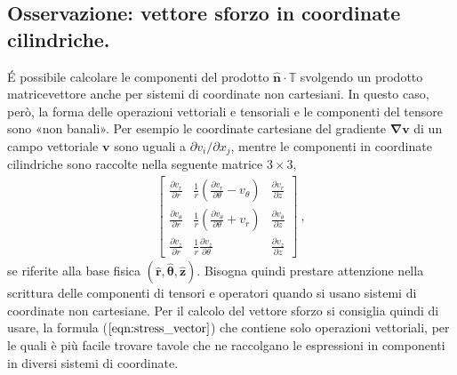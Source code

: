 \documentclass[letterpaper,10pt,italian]{jupyterBook}
\begin{document}
\subsection{Osservazione: vettore sforzo in coordinate cilindriche.}
\label{\detokenize{polimi/fluidmechanics-ita/template/capitoli/06_slnEsatte/0600in:osservazione-vettore-sforzo-in-coordinate-cilindriche}}
\sphinxAtStartPar
É possibile calcolare le componenti del prodotto
\(\mathbf{\hat{n}} \cdot \mathbb{T}\) svolgendo un prodotto matrice\sphinxhyphen{}vettore
anche per sistemi di coordinate non cartesiani. In questo caso, però, la
forma delle operazioni vettoriali e tensoriali e le componenti del
tensore sono «non banali». Per esempio le coordinate cartesiane del
gradiente \(\mathbf{\nabla} \mathbf{v}\) di un campo vettoriale \(\mathbf{v}\) sono
uguali a \(\partial v_i / \partial x_j\), mentre le componenti in
coordinate cilindriche sono raccolte nella seguente matrice \(3\times 3\),
\begin{equation*}
\begin{split}\begin{bmatrix}
\frac{\partial v_r}{\partial r} & 
 \frac{1}{r}\left( \frac{\partial v_r}{\partial \theta}-v_\theta \right) &
 \frac{\partial v_r}{\partial z}   \\
\frac{\partial v_\theta}{\partial r} & 
 \frac{1}{r}\left( \frac{\partial v_\theta}{\partial \theta}+v_r \right) & 
 \frac{\partial v_\theta}{\partial z} \\
\frac{\partial v_z}{\partial r} &
 \frac{1}{r}\frac{\partial v_z}{\partial \theta} &
 \frac{\partial v_z}{\partial z}
\end{bmatrix} \ ,\end{split}
\end{equation*}
\sphinxAtStartPar
se riferite alla base fisica
\((\mathbf{\hat{r}},\mathbf{\hat{\theta}},\mathbf{\hat{z}})\). Bisogna quindi prestare
attenzione nella scrittura delle componenti di tensori e operatori
quando si usano sistemi di coordinate non cartesiane. Per il calcolo del
vettore sforzo si consiglia quindi di usare, la formula
(\(\ref{eqn:stress_vector}\)) che contiene solo operazioni vettoriali, per
le quali è più facile trovare tavole che ne raccolgano le espressioni in
componenti in diversi sistemi di coordinate.
\end{document}
